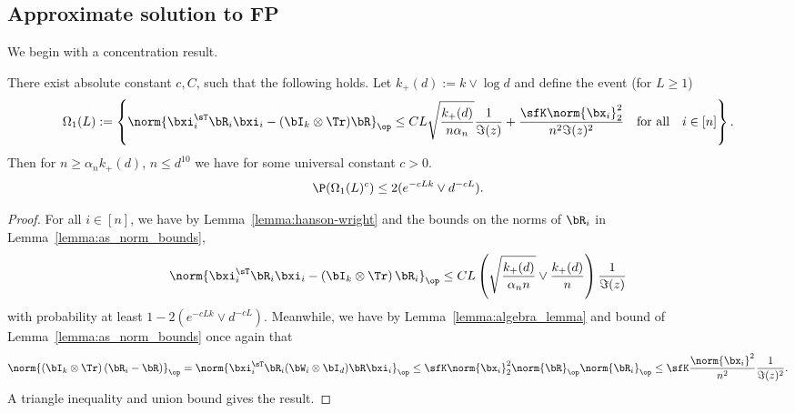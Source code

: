\subsection{Approximate solution to FP}
\label{sec:approx_ST_FP}
We begin with a concentration result.
\begin{lemma}
\label{lemma:concentration_loo_quad_form}
There exist absolute constant $c,C$, such that the following holds.
Let $k_+(d):= k\vee \log d$ and define the event (for $L\ge 1$)
\begin{equation}
\label{eq:concentration_loo_quad_form_2}
   \Omega_1(L) := \left\{\norm{\bxi_i^\sT \bR_i \bxi_i - (\bI_k \otimes \Tr)\bR}_\op
   \le  C L\sqrt{\frac{k_+(d)}{n \alpha_n}} \frac1{\Im(z)} 
   +  \frac{\sfK\norm{\bx_i}_2^2}{n^2 \Im(z)^2}\quad\textrm{for all}\quad i\in[n]\right\}.
\end{equation}
Then for  $n\ge \alpha_n k_+(d)$, $n\le d^{10}$ we have
for some universal constant $c>0$.
\begin{equation}
\nonumber
    \P(\Omega_1(L)^c) \le 2 (e^{- cLk}\vee d^{-cL}).
\end{equation}
\end{lemma}
\begin{proof}

For all $i\in[n]$, we have by Lemma~\ref{lemma:hanson-wright} and the bounds on the norms of $\bR_i$ in Lemma~\ref{lemma:as_norm_bounds}, 
\begin{equation}
\nonumber
    \norm{\bxi_i^\sT\bR_i \bxi_i - \left(\bI_k \otimes\Tr\right) \bR_i}_\op \le 
    C L\left(
    \sqrt{\frac{k_+(d)}{\alpha_n n}}
     \vee \frac{k_+(d)}{n} \right)
    \frac1{\Im(z)}
\end{equation}
%
with probability  at least $1-2 (e^{- cLk}\vee d^{-cL})$.
Meanwhile, we have by
Lemma~\ref{lemma:algebra_lemma} and bound of Lemma~\ref{lemma:as_norm_bounds} once again that
    \begin{align}
    \nonumber
        \norm{(\bI_k \otimes \Tr)\left(\bR_i - \bR\right) }_\op = 
\norm{\bxi_i^\sT \bR_i (\bW_i \otimes \bI_d) \bR\bxi_i}_\op
\le \sfK \norm{\bx_i}_2^2 \norm{\bR}_\op\norm{\bR_i}_\op
\le \sfK \frac{\norm{\bx_i}^2}{n^2}\frac1{\Im(z)^2}.
%
    \end{align}
A triangle inequality and union bound gives the result.
\end{proof}

